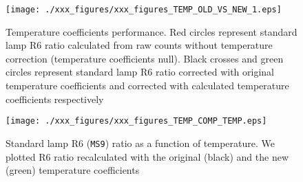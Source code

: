 \begin{figure}[htbp!]
\begin{center}   
     \texttt{[image: ./xxx\_figures/xxx\_figures\_TEMP\_OLD\_VS\_NEW\_1.eps]}
     \caption{Temperature coefficients performance. Red circles represent standard lamp R6 ratio calculated from raw counts without temperature correction (temperature coefficients null). Black crosses and green circles represent standard lamp R6 ratio corrected with original temperature coefficients and corrected with calculated temperature coefficients respectively}
	   \label{fig:TEMP_OLD_VS_NEW_1}
\end{center}
\end{figure}


\begin{figure}[htbp!]
\begin{center}   
     \texttt{[image: ./xxx\_figures/xxx\_figures\_TEMP\_COMP\_TEMP.eps]}
     \caption{ Standard lamp R6 (\texttt{MS9}) ratio as a function of temperature. We plotted R6 ratio recalculated with the original (black) and the new (green) temperature coefficients}
	   \label{fig:TEMP_COMP_TEMP}
\end{center}
\end{figure}



